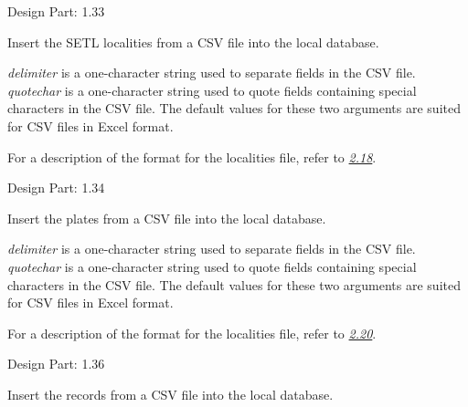 \documentclass[letterpaper,10pt,english]{sphinxmanual}
\begin{document}
\begin{fulllineitems}
\begin{fulllineitems}
Design Part: 1.33

\end{fulllineitems}


\begin{fulllineitems}
\label{setlyze/database:setlyze.database.MakeLocalDB.insert_localities_from_csv}
Insert the SETL localities from a CSV file into the local
database.

\emph{delimiter} is a one-character string used to separate fields
in the CSV file. \emph{quotechar} is a one-character string used to
quote fields containing special characters in the CSV file.
The default values for these two arguments are suited for CSV
files in Excel format.

For a description of the format for the localities file, refer
to {\hyperref[design_parts_data:design-part-data-2-18]{\emph{2.18}}}.

Design Part: 1.34

\end{fulllineitems}


\begin{fulllineitems}
\label{setlyze/database:setlyze.database.MakeLocalDB.insert_plates_from_csv}
Insert the plates from a CSV file into the local database.

\emph{delimiter} is a one-character string used to separate fields
in the CSV file. \emph{quotechar} is a one-character string used to
quote fields containing special characters in the CSV file.
The default values for these two arguments are suited for CSV
files in Excel format.

For a description of the format for the localities file, refer
to {\hyperref[design_parts_data:design-part-data-2-20]{\emph{2.20}}}.

Design Part: 1.36

\end{fulllineitems}


\begin{fulllineitems}
\label{setlyze/database:setlyze.database.MakeLocalDB.insert_records_from_csv}
Insert the records from a CSV file into the local database.


\end{fulllineitems}
\end{fulllineitems}
\end{document}
